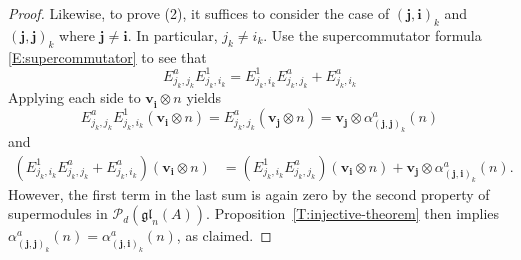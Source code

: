 \documentclass[10pt,a4paper]{amsart}
\newcommand{\Itwo}{\tilde{I}^{2}(n,d)}
\newcommand{\Pol}{\mathcal{P}}
\newcommand{\bi}{\mathbf{i}}
\newcommand{\bj}{\mathbf{j}}
\newcommand{\bv}{\mathbf{v}}
\newcommand{\gl}{\mathfrak{gl}}
\begin{document}
\begin{proof}
Likewise, to prove (2), it suffices to consider the case of $(\bj, \bi)_{k}$ and $(\bj, \bj )_{k}$ where $\bj \neq \bi$.  In particular, $j_{k} \neq i_{k}$.  Use the supercommutator formula \eqref{E:supercommutator} to see that 
\[
E^{a}_{j_{k}, j_{k}}E^{1}_{j_{k}, i_{k}} = E^{1}_{j_{k}, i_{k}}E^{a}_{j_{k}, j_{k}} + E^{a}_{j_{k}, i_{k}}
\]  Applying each side to $ \bv_{\bi}^{} \otimes n$ yields
\[
E^{a}_{j_{k}, j_{k}}E^{1}_{j_{k}, i_{k}}( \bv_{\bi}^{} \otimes n) = E^{a}_{j_{k}, j_{k}}\left( \bv_{\bj}^{} \otimes n \right) =  \bv_{\bj}^{} \otimes \alpha_{(\bj , \bj)_{k}}^{a} (n)
\]
and 
\begin{align*}
\left( E^{1}_{j_{k}, i_{k}}E^{a}_{j_{k}, j_{k}} + E^{a}_{j_{k}, i_{k}}\right)( \bv_{\bi} \otimes n) &= \left( E^{1}_{j_{k}, i_{k}}E^{a}_{j_{k}, j_{k}}\right)( \bv_{\bi} \otimes n) +  \bv_{\bj} \otimes  \alpha_{(\bj, \bi)_{k}}^{a}(n).
\end{align*}  However, the first term in the last sum is again zero by the second property of supermodules in $\Pol_{d}(\gl_{n}(A))$.  Proposition~\ref{T:injective-theorem} then implies $\alpha_{(\bj , \bj)_{k}}^{a} (n) = \alpha_{(\bj, \bi)_{k}}^{a}(n)$, as claimed.

\end{proof}
\end{document}
